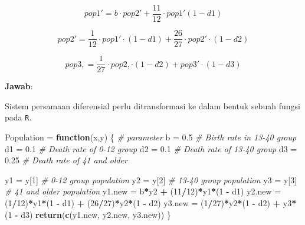 \documentclass[]{book}
\newenvironment{Shaded}{\begin{snugshade}}{\end{snugshade}}
\newcommand{\CommentTok}[1]{\textcolor[rgb]{0.56,0.35,0.01}{\textit{#1}}}
\newcommand{\ControlFlowTok}[1]{\textcolor[rgb]{0.13,0.29,0.53}{\textbf{#1}}}
\newcommand{\DecValTok}[1]{\textcolor[rgb]{0.00,0.00,0.81}{#1}}
\newcommand{\FloatTok}[1]{\textcolor[rgb]{0.00,0.00,0.81}{#1}}
\newcommand{\KeywordTok}[1]{\textcolor[rgb]{0.13,0.29,0.53}{\textbf{#1}}}
\newcommand{\NormalTok}[1]{#1}
\newcommand{\OperatorTok}[1]{\textcolor[rgb]{0.81,0.36,0.00}{\textbf{#1}}}
\newcommand{\StringTok}[1]{\textcolor[rgb]{0.31,0.60,0.02}{#1}}
\theoremstyle{definition}
\theoremstyle{definition}
\theoremstyle{definition}
\theoremstyle{remark}
\begin{document}
\[
pop1' = b\cdot pop2'+\frac{11}{12}\cdot pop1'\left(1-d1\right)  
\]

\[
pop2' = \frac{1}{12}\cdot pop1'\cdot\left(1-d1\right)+\frac{26}{27}\cdot pop2'\cdot \left(1-d2\right)  
\]

\[
pop3, = \frac{1}{27}\cdot pop2,\cdot\left(1-d2\right)+ pop3'\cdot \left(1-d3\right)  
\]

\textbf{Jawab}:

Sistem persamaan diferensial perlu ditransformasi ke dalam bentuk sebuah fungsi pada \texttt{R}.

\begin{Shaded}
\begin{Highlighting}[]
\NormalTok{Population =}\StringTok{ }\ControlFlowTok{function}\NormalTok{(x,y) \{}
   \CommentTok{# parameter}
\NormalTok{   b =}\StringTok{ }\FloatTok{0.5} \CommentTok{# Birth rate in 13-40 group}
\NormalTok{   d1 =}\StringTok{ }\FloatTok{0.1} \CommentTok{# Death rate of 0-12 group}
\NormalTok{   d2 =}\StringTok{ }\FloatTok{0.1} \CommentTok{# Death rate of 13-40 group}
\NormalTok{   d3 =}\StringTok{ }\FloatTok{0.25} \CommentTok{# Death rate of 41 and older}
   
\NormalTok{   y1 =}\StringTok{ }\NormalTok{y[}\DecValTok{1}\NormalTok{] }\CommentTok{# 0-12 group population}
\NormalTok{   y2 =}\StringTok{ }\NormalTok{y[}\DecValTok{2}\NormalTok{] }\CommentTok{# 13-40 group population}
\NormalTok{   y3 =}\StringTok{ }\NormalTok{y[}\DecValTok{3}\NormalTok{] }\CommentTok{# 41 and older population}
\NormalTok{   y1.new =}\StringTok{ }\NormalTok{b}\OperatorTok{*}\NormalTok{y2 }\OperatorTok{+}\StringTok{ }\NormalTok{(}\DecValTok{11}\OperatorTok{/}\DecValTok{12}\NormalTok{)}\OperatorTok{*}\NormalTok{y1}\OperatorTok{*}\NormalTok{(}\DecValTok{1} \OperatorTok{-}\StringTok{ }\NormalTok{d1)}
\NormalTok{   y2.new =}\StringTok{ }\NormalTok{(}\DecValTok{1}\OperatorTok{/}\DecValTok{12}\NormalTok{)}\OperatorTok{*}\NormalTok{y1}\OperatorTok{*}\NormalTok{(}\DecValTok{1} \OperatorTok{-}\StringTok{ }\NormalTok{d1) }\OperatorTok{+}\StringTok{ }\NormalTok{(}\DecValTok{26}\OperatorTok{/}\DecValTok{27}\NormalTok{)}\OperatorTok{*}\NormalTok{y2}\OperatorTok{*}\NormalTok{(}\DecValTok{1} \OperatorTok{-}\StringTok{ }\NormalTok{d2)}
\NormalTok{   y3.new =}\StringTok{ }\NormalTok{(}\DecValTok{1}\OperatorTok{/}\DecValTok{27}\NormalTok{)}\OperatorTok{*}\NormalTok{y2}\OperatorTok{*}\NormalTok{(}\DecValTok{1} \OperatorTok{-}\StringTok{ }\NormalTok{d2) }\OperatorTok{+}\StringTok{ }\NormalTok{y3}\OperatorTok{*}\NormalTok{(}\DecValTok{1} \OperatorTok{-}\StringTok{ }\NormalTok{d3)}
   \KeywordTok{return}\NormalTok{(}\KeywordTok{c}\NormalTok{(y1.new, y2.new, y3.new))}
\NormalTok{\}}
\end{Highlighting}
\end{Shaded}
\end{document}
